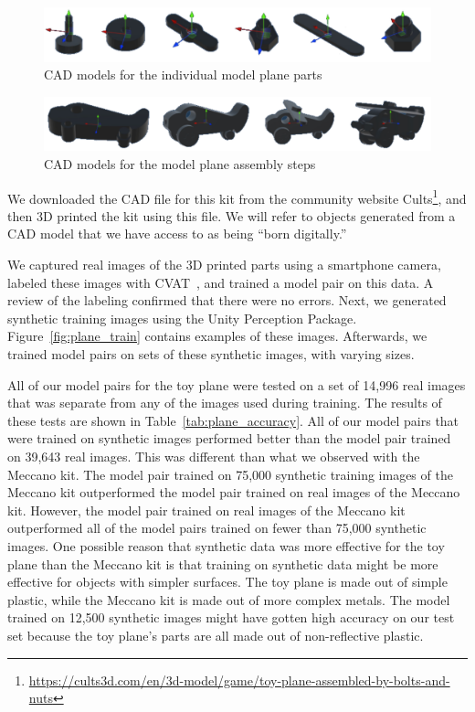 \begin{figure}
  \includegraphics[width=\columnwidth]{figures/synthetic/plane_parts.pdf}
  \caption{
    CAD models for the individual model plane parts
  }\label{fig:plane_parts}
\end{figure}

\begin{figure}
  \includegraphics[width=\columnwidth]{figures/synthetic/plane_steps.pdf}
  \caption{
    CAD models for the model plane assembly steps
  }\label{fig:plane_steps}
\end{figure}

We downloaded the CAD file for this kit from the community website
Cults\footnote{\url{https://cults3d.com/en/3d-model/game/toy-plane-assembled-by-bolts-and-nuts}},
and then 3D printed the kit using this file.
We will refer to objects generated from a CAD model that we have access to as
being ``born digitally.''

We captured real images of the 3D printed parts using a smartphone camera,
labeled these images with CVAT~{\cite{CVAT}}, and trained a model pair on this
data.
A review of the labeling confirmed that there were no errors.
Next, we generated synthetic training images using the Unity Perception Package.
Figure~\ref{fig:plane_train} contains examples of these images.
Afterwards, we trained model pairs on sets of these synthetic images, with
varying sizes.

All of our model pairs for the toy plane were tested on a set of 14,996 real
images that was separate from any of the images used during training.
The results of these tests are shown in Table~\ref{tab:plane_accuracy}.
All of our model pairs that were trained on synthetic images performed better
than the model pair trained on 39,643 real images.
This was different than what we observed with the Meccano kit.
The model pair trained on 75,000 synthetic training images of the Meccano
kit outperformed the model pair trained on real images of the Meccano kit.
However, the model pair trained on real images of the Meccano kit outperformed
all of the model pairs trained on fewer than 75,000 synthetic images.
One possible reason that synthetic data was more effective for the toy plane
than the Meccano kit is that training on synthetic data might be more effective
for objects with simpler surfaces.
The toy plane is made out of simple plastic, while the Meccano kit is made out
of more complex metals.
The model trained on 12,500 synthetic images might have gotten high accuracy on
our test set because the toy plane's parts are all made out of non-reflective
plastic.

